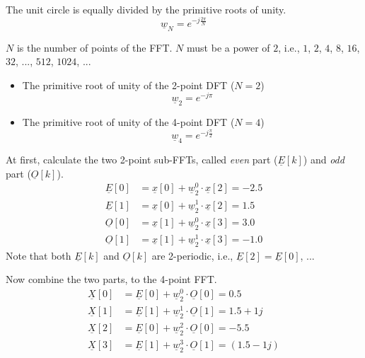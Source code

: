 \begin{solution}
\begin{tasks}
		\task
		The unit circle is equally divided by the primitive roots of unity.
		\begin{equation}
			\underline{w}_N = e^{- j \frac{2 \pi}{N}}
		\end{equation}
		
		$N$ is the number of points of the FFT. $N$ must be a power of $2$, i.e., $1$, $2$, $4$, $8$, $16$, $32$, ..., $512$, $1024$, ...
		
		\begin{itemize}
			\item The primitive root of unity of the 2-point DFT ($N = 2$)
			\begin{equation*}
				\underline{w}_2 = e^{- j \pi}
			\end{equation*}
			\item The primitive root of unity of the 4-point DFT ($N = 4$)
			\begin{equation*}
				\underline{w}_4 = e^{- j \frac{\pi}{2}}
			\end{equation*}
		\end{itemize}
	
		\task
		At first, calculate the two 2-point sub-FFTs, called \emph{even} part ($\underline{E}[k]$) and \emph{odd} part ($\underline{O}[k]$).
		\begin{equation*}
			\begin{split}
				\underline{E}[0] &= \underline{x}[0] + \underline{w}_2^{0} \cdot \underline{x}[2] = -2.5 \\
				\underline{E}[1] &= \underline{x}[0] + \underline{w}_2^{1} \cdot \underline{x}[2] = 1.5 \\
				\underline{O}[0] &= \underline{x}[1] + \underline{w}_2^{0} \cdot \underline{x}[3] = 3.0 \\
				\underline{O}[1] &= \underline{x}[1] + \underline{w}_2^{1} \cdot \underline{x}[3] = -1.0
			\end{split}
		\end{equation*}
		Note that both $\underline{E}[k]$ and $\underline{O}[k]$ are 2-periodic, i.e., $\underline{E}[2] = \underline{E}[0]$, ...
		
		Now combine the two parts, to the 4-point FFT.
		\begin{equation*}
			\begin{split}
				\underline{X}[0] &= \underline{E}[0] + \underline{w}_2^{0} \cdot \underline{O}[0] = 0.5 \\
				\underline{X}[1] &= \underline{E}[1] + \underline{w}_2^{1} \cdot \underline{O}[1] = 1.5+1j \\
				\underline{X}[2] &= \underline{E}[0] + \underline{w}_2^{2} \cdot \underline{O}[0] = -5.5 \\
				\underline{X}[3] &= \underline{E}[1] + \underline{w}_2^{3} \cdot \underline{O}[1] = (1.5-1j)
			\end{split}
		\end{equation*}
		

\end{tasks}
\end{solution}
